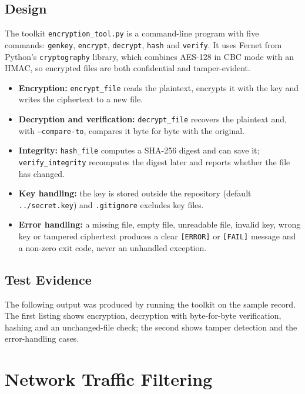\documentclass[11pt]{article}
\begin{document}
\subsection{Design}
The toolkit \texttt{encryption\_tool.py} is a command-line program with five commands: \texttt{genkey}, \texttt{encrypt}, \texttt{decrypt}, \texttt{hash} and \texttt{verify}. It uses Fernet from Python's \texttt{cryptography} library, which combines AES-128 in CBC mode with an HMAC, so encrypted files are both confidential and tamper-evident.
\begin{itemize}
\item \textbf{Encryption:} \texttt{encrypt\_file} reads the plaintext, encrypts it with the key and writes the ciphertext to a new file.
\item \textbf{Decryption and verification:} \texttt{decrypt\_file} recovers the plaintext and, with \texttt{--compare-to}, compares it byte for byte with the original.
\item \textbf{Integrity:} \texttt{hash\_file} computes a SHA-256 digest and can save it; \texttt{verify\_integrity} recomputes the digest later and reports whether the file has changed.
\item \textbf{Key handling:} the key is stored outside the repository (default \texttt{../secret.key}) and \texttt{.gitignore} excludes key files.
\item \textbf{Error handling:} a missing file, empty file, unreadable file, invalid key, wrong key or tampered ciphertext produces a clear \texttt{[ERROR]} or \texttt{[FAIL]} message and a non-zero exit code, never an unhandled exception.
\end{itemize}

\subsection{Test Evidence}
The following output was produced by running the toolkit on the sample record. The first listing shows encryption, decryption with byte-for-byte verification, hashing and an unchanged-file check; the second shows tamper detection and the error-handling cases.





\section{Network Traffic Filtering}
\label{sec:firewall}
\end{document}
